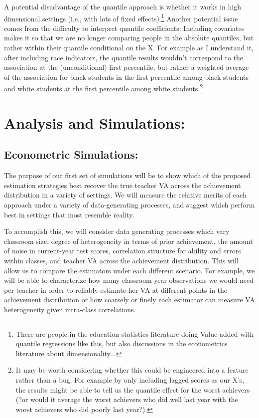 \documentclass[letterpaper,12pt]{article}
\begin{document}
A potential disadvantage of the quantile approach is whether it works in high dimensional settings (i.e., with lots of fixed effects).\footnote{There are people in the education statistics literature doing Value added with quantile regressions like this, but also discussions in the econometrics literature about dimensionality...} Another potential issue comes from the difficulty to interpret quantile coefficients: Including covariates makes it so that we are no longer comparing people in the absolute quantiles, but rather within their quantile conditional on the X. For example as I understand it, after including race indicators, the quantile results wouldn't correspond to the association at the (unconditional) first percentile, but rather a weighted average of the association for black students in the first percentile among black students and white students at the first percentile among white students.\footnote{It may be worth considering whether this could be engineered into a feature rather than a bug. For example by only including lagged scores as our X's, the results might be able to tell us the quantile effect for the worst achievers (?or would it average the worst achievers who did well last year with the worst achievers who did poorly last year?).}




\section{Analysis and Simulations:}


\subsection{Econometric Simulations:}

The purpose of our first set of simulations will be to show which of the proposed estimation strategies best recover the true teacher VA across the achievement distribution in a variety of settings. We will measure the relative merits of each approach under a variety of data-generating processes, and suggest which perform best in settings that most resemble reality.

To accomplish this, we will consider data generating processes which vary classroom size, degree of heterogeneity in terms of prior achievement, the amount of noise in current-year test scores, correlation structure for ability and errors within classes, and teacher VA across the achievement distribution. This will allow us to compare the estimators under each different scenario. For example, we will be able to characterize how many classroom-year observations we would need per teacher in order to reliably estimate her VA at different points in the achievement distribution or how coarsely or finely each estimator can measure VA heterogeneity given intra-class correlations. 
\end{document}
